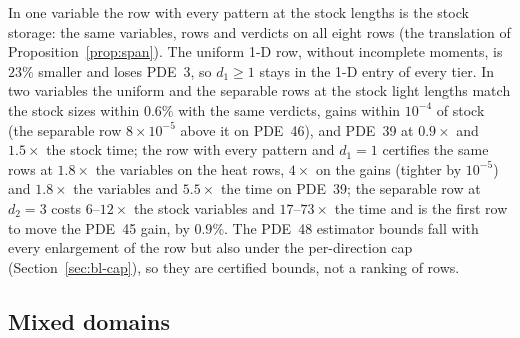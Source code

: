 In one variable the row with every pattern at the stock lengths is the stock storage: the same variables, rows and verdicts on all eight rows (the translation of Proposition~\ref{prop:span}). The uniform 1-D row, without incomplete moments, is $23\%$ smaller and loses PDE~3, so $d_1\ge1$ stays in the 1-D entry of every tier. In two variables the uniform and the separable rows at the stock light lengths match the stock sizes within $0.6\%$ with the same verdicts, gains within $10^{-4}$ of stock (the separable row $8\times10^{-5}$ above it on PDE~46), and PDE~39 at $0.9\times$ and $1.5\times$ the stock time; the row with every pattern and $d_1=1$ certifies the same rows at $1.8\times$ the variables on the heat rows, $4\times$ on the gains (tighter by $10^{-5}$) and $1.8\times$ the variables and $5.5\times$ the time on PDE~39; the separable row at $d_2=3$ costs $6$--$12\times$ the stock variables and $17$--$73\times$ the time and is the first row to move the PDE~45 gain, by $0.9\%$. The PDE~48 estimator bounds fall with every enlargement of the row but also under the per-direction cap (Section~\ref{sec:bl-cap}), so they are certified bounds, not a ranking of rows.

\subsection{Mixed domains}\label{sec:bl-mixed}

